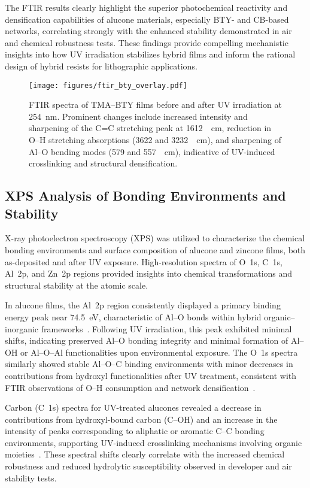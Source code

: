 The FTIR results clearly highlight the superior photochemical reactivity and densification capabilities of alucone materials, especially BTY- and CB-based networks, correlating strongly with the enhanced stability demonstrated in air and chemical robustness tests. These findings provide compelling mechanistic insights into how UV irradiation stabilizes hybrid films and inform the rational design of hybrid resists for lithographic applications.


\begin{figure}[ht]
  \centering
  \texttt{[image: figures/ftir\_bty\_overlay.pdf]}
  \caption{FTIR spectra of TMA–BTY films before and after UV irradiation at 254~nm. Prominent changes include increased intensity and sharpening of the C=C stretching peak at 1612~\si{\per\centi\meter}, reduction in O–H stretching absorptions (3622 and 3232~\si{\per\centi\meter}), and sharpening of Al–O bending modes (579 and 557~\si{\per\centi\meter}), indicative of UV-induced crosslinking and structural densification.}
  \label{fig:ftir}
\end{figure}

\subsection{XPS Analysis of Bonding Environments and Stability}

X-ray photoelectron spectroscopy (XPS) was utilized to characterize the chemical bonding environments and surface composition of alucone and zincone films, both as-deposited and after UV exposure. High-resolution spectra of O~1s, C~1s, Al~2p, and Zn~2p regions provided insights into chemical transformations and structural stability at the atomic scale.

In alucone films, the Al~2p region consistently displayed a primary binding energy peak near 74.5~eV, characteristic of Al--O bonds within hybrid organic--inorganic frameworks~\cite{REF}. Following UV irradiation, this peak exhibited minimal shifts, indicating preserved Al--O bonding integrity and minimal formation of Al--OH or Al--O--Al functionalities upon environmental exposure. The O~1s spectra similarly showed stable Al--O--C binding environments with minor decreases in contributions from hydroxyl functionalities after UV treatment, consistent with FTIR observations of O--H consumption and network densification~\cite{REF}.

Carbon (C~1s) spectra for UV-treated alucones revealed a decrease in contributions from hydroxyl-bound carbon (C--OH) and an increase in the intensity of peaks corresponding to aliphatic or aromatic C--C bonding environments, supporting UV-induced crosslinking mechanisms involving organic moieties~\cite{REF}. These spectral shifts clearly correlate with the increased chemical robustness and reduced hydrolytic susceptibility observed in developer and air stability tests.

